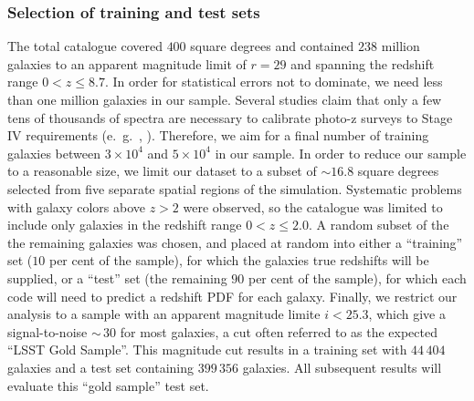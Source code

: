 \subsubsection{Selection of training and test sets}
\label{sec:buzztraining}
The total catalogue covered $400$ square degrees and contained $238$ million galaxies to an apparent magnitude limit of $r\!=\!29$ and spanning the redshift range $0\!<\!z\!\leq\!8.7$.  In order for statistical errors not to dominate, we need less than one million galaxies in our sample.  Several studies claim that only a few tens of thousands of spectra are necessary to calibrate photo-z surveys to Stage IV requirements (e.~g.~\citet{Bernstein:10}, \citet{Masters:2017}).  Therefore, we aim for a final number of training galaxies between $3\times 10^{4}$ and $5\times 10^{4}$ in our sample.
In order to reduce our sample to a reasonable size, we limit our dataset to a subset of $\sim\!16.8$ square degrees selected from five separate spatial regions of the simulation. Systematic problems with galaxy colors above $z\!>\!2$ were observed, so the catalogue was limited to include only galaxies in the redshift range $0\!<\!z\!\leq\!2.0$. A random subset of the the remaining galaxies was chosen, and placed at random into either a ``training'' set ($10$ per cent of the sample), for which the galaxies true redshifts will be supplied, or a ``test'' set (the remaining $90$ per cent of the sample), for which each code will need to predict a redshift PDF for each galaxy. %
Finally, we restrict our analysis to a sample with an apparent magnitude limite $i<25.3$, which give a signal-to-noise $\sim\,30$ for most galaxies, a cut often referred to as the expected ``LSST Gold Sample''.  This magnitude cut results in a training set with $44\,404$ galaxies and a test set containing $399\,356$ galaxies.  All subsequent results will evaluate this ``gold sample'' test set.

